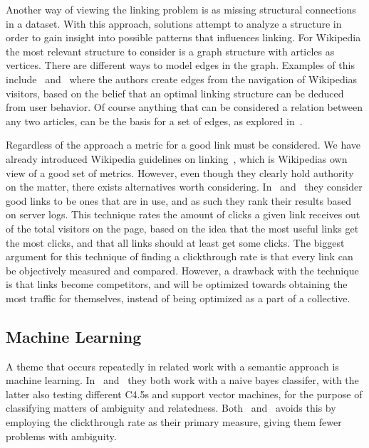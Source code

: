 Another way of viewing the linking problem is as missing structural connections in a dataset. With this approach, solutions attempt to analyze a structure in order to gain insight into possible patterns that influences linking. For Wikipedia the most relevant structure to consider is a graph structure with articles as vertices. There are different ways to model edges in the graph. Examples of this include~\cite{hyperlink-structure-using-logs} and~\cite{west2015mining} where the authors create edges from the navigation of Wikipedias visitors, based on the belief that an optimal linking structure can be deduced from user behavior. Of course anything that can be considered a relation between any two articles, can be the basis for a set of edges, as explored in~\cite{lu2011link}.

Regardless of the approach a metric for a good link must be considered. We have already introduced Wikipedia guidelines on linking~\cite{wiki-editor-guidelines}, which is Wikipedias own view of a good set of metrics. However, even though they clearly hold authority on the matter, there exists alternatives worth considering. In~\cite{hyperlink-structure-using-logs} and~\cite{west2015mining} they consider good links to be ones that are in use, and as such they rank their results based on server logs. This technique rates the amount of clicks a given link receives out of the total visitors on the page, based on the idea that the most useful links get the most clicks, and that all links should at least get some clicks. The biggest argument for this technique of finding a clickthrough rate is that every link can be objectively measured and compared. However, a drawback with the technique is that links become competitors, and will be optimized towards obtaining the most traffic for themselves, instead of being optimized as a part of a collective.

\subsection{Machine Learning}\label{related_machine_learning}

A theme that occurs repeatedly in related work with a semantic approach is machine learning. In~\cite{mihalcea2007wikify} and~\cite{milne2008learning} they both work with a naive bayes classifer, with the latter also testing different C4.5s and support vector machines, for the purpose of classifying matters of ambiguity and relatedness. Both~\cite{hyperlink-structure-using-logs} and~\cite{west2015mining} avoids this by employing the clickthrough rate as their primary measure, giving them fewer problems with ambiguity.

